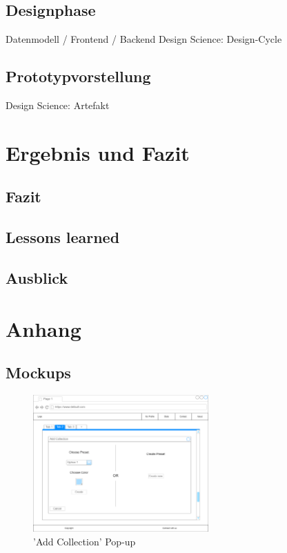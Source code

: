 \documentclass[a4paper, 12pt]{article}
\begin{document}
    \subsection{Designphase}\label{subsec:designphase}
    Datenmodell / Frontend / Backend
    Design Science: Design-Cycle
    
    \subsection{Prototypvorstellung}
    Design Science: Artefakt

    \newpage
    
    \section{Ergebnis und Fazit}
    
    \subsection{Fazit}
    
    \subsection{Lessons learned}
    
    \subsection{Ausblick}

    \newpage

    \appendix

    \section{Anhang}
    
    \subsection{Mockups}

    \begin{figure}[htbp]
        \centering
        \includegraphics[width=0.6\textwidth]{add_collection_pop_up}
        \caption{'Add Collection' Pop-up}
    \end{figure}    
        
\end{document}

